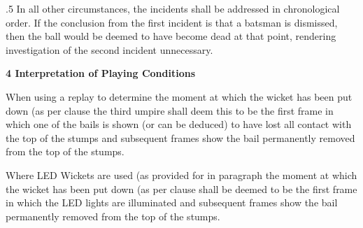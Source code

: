 \documentclass[12pt]{article}
\begin{document}
\vspace{\baselineskip}
\begin{adjustwidth}{0.5in}{0.04in}
{\fontsize{9pt}{10.8pt}.5 \tabto{0.49in} In all other circumstances, the incidents shall be addressed in chronological order. If the conclusion from the first incident is that a batsman is dismissed, then the ball would be deemed to have become dead at that point, rendering investigation of the second incident unnecessary.\par}\par

\end{adjustwidth}


\vspace{\baselineskip}
{\fontsize{16pt}{19.2pt}\selectfont \textbf{4 \tabto{0.47in} Interpretation of Playing Conditions}\par}\par


\vspace{\baselineskip}
\begin{adjustwidth}{0.49in}{0.1in}
{\fontsize{9pt}{10.8pt} \tabto{0.47in} When using a replay to determine the moment at which the wicket has been put down (as per clause  the third umpire shall deem this to be the first frame in which one of the bails is shown (or can be deduced) to have lost all contact with the top of the stumps and subsequent frames show the bail permanently removed from the top of the stumps.\par}\par

\end{adjustwidth}


\vspace{\baselineskip}
\begin{adjustwidth}{0.49in}{0.25in}
{\fontsize{9pt}{10.8pt} \tabto{0.47in} Where LED Wickets are used (as provided for in paragraph the moment at which the wicket has been put down (as per clause shall be deemed to be the first frame in which the LED lights are illuminated and subsequent frames show the bail permanently removed from the top of the stumps.\par}\par

\end{adjustwidth}


\vspace{\baselineskip}

\vspace{\baselineskip}
\end{document}

